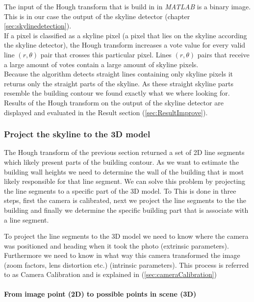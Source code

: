 	The input of the Hough transform that is build in in \emph{MATLAB} is a binary
	image. This is in our case the output of the skyline detector (chapter
	\ref{sec:skylinedetection}).\\
	If a pixel is classified as a skyline pixel (a pixel that lies on the
	skyline according the skyline detector), the Hough transform increases
	a vote value for every valid line $(r,\theta)$ pair that crosses this
	particular pixel.  
	Lines $(r,\theta)$ pairs that receive a large amount of votes
	contain a large amount of skyline pixels.\\
	Because the algorithm detects straight lines containing only skyline pixels
	it returns only the straight parts of the skyline.
	As these straight skyline parts resemble the building contour
	we found exactly what we where looking for.\\

	Results of the Hough transform on the output of the skyline detector are
	displayed and evaluated in the Result section (\ref{sec:ResultImprove}).

\subsubsection{Project the skyline to the 3D model}
\label{sec:project}

	The Hough transform of the previous section returned a set of 2D line
	segments which likely present parts of the building contour.  
	As we want to estimate the building wall heights we need to determine the wall
	of the building that is most likely responsible for that line segment.
	We can solve this problem by projecting the line segments to a specific
	part of the 3D model. To 
	This is done in three steps, first the camera is calibrated, next we
	project the line segments to the the building and finally we 
	determine the specific building part that is associate with a line segment.


	To project the line segments to the 3D model we need to know where the
	camera was positioned and heading when it took the photo (extrinsic
	parameters). Furthermore we need to know in what way this camera transformed
	the image (zoom factors, lens distortion etc.) (intrinsic parameters).
	This process is referred to as Camera Calibration and is explained in 
	(\ref{sec:cameraCalibration})
	 
	\paragraph{From image point (2D) to possible points in scene (3D)} 

